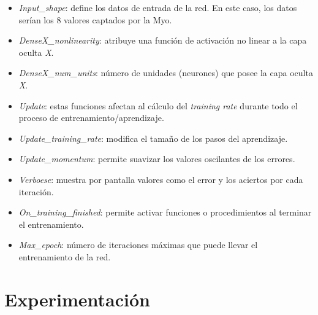 \begin{itemize}

\item \textit{Input\_shape}: define los datos de entrada de la red. En este caso, los datos serían los 8 valores
captados por la Myo.

\item \textit{DenseX\_nonlinearity}: atribuye una función de activación no linear a la capa oculta \textit{X}.

\item \textit{DenseX\_num\_units}: número de unidades (neurones) que posee la capa oculta \textit{X}.

\item \textit{Update}: estas funciones afectan al cálculo del \textit{training rate} durante todo el proceso
de entrenamiento/aprendizaje.

\item \textit{{Update\_training\_rate}}: modifica el tamaño de los pasos del aprendizaje.

\item \textit{Update\_momentum}: permite suavizar los valores oscilantes de los errores.

\item \textit{Verboese}: muestra por pantalla valores como el error y los aciertos por cada iteración.

\item \textit{On\_training\_finished}: permite activar funciones o procedimientos al terminar el entrenamiento.

\item \textit{Max\_epoch}: número de iteraciones máximas que puede llevar el entrenamiento de la red.

\end{itemize}




%
%
%
%

\newpage

\section{Experimentación}
\label{sec:experimentación}


